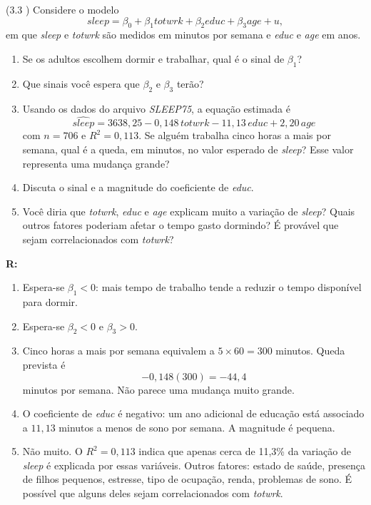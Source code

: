 \documentclass[12pt,letterpaper, onecolumn]{exam}
\renewenvironment{solution}
  {\par\noindent\textbf{R:}\enspace\color{blue}}
  {\par\color{black}}
\begin{document}
\begin{questions}
\question (3.3 \citep{wooldridge2016}) Considere o modelo
\[
sleep=\beta_0+\beta_1totwrk+\beta_2educ+\beta_3age+u,
\]
em que \textit{sleep} e \textit{totwrk} são medidos em minutos por semana e \textit{educ} e \textit{age} em anos.
\begin{enumerate}[label=(\alph*)]
    \item Se os adultos escolhem dormir e trabalhar, qual é o sinal de $\beta_1$?
    \item Que sinais você espera que $\beta_2$ e $\beta_3$ terão?
    \item Usando os dados do arquivo \textit{SLEEP75}, a equação estimada é
    \[
    \widehat{sleep}=3638{,}25-0{,}148\,totwrk-11{,}13\,educ+2{,}20\,age
    \]
    com \(n=706\) e \(R^2=0{,}113\). Se alguém trabalha cinco horas a mais por semana, qual é a queda, em minutos, no valor esperado de \textit{sleep}? Esse valor representa uma mudança grande?
    \item Discuta o sinal e a magnitude do coeficiente de \textit{educ}.
    \item Você diria que \textit{totwrk}, \textit{educ} e \textit{age} explicam muito a variação de \textit{sleep}? Quais outros fatores poderiam afetar o tempo gasto dormindo? É provável que sejam correlacionados com \textit{totwrk}?
\end{enumerate}

\begin{solution}
\begin{enumerate}[label=(\alph*)]
    \item Espera-se \(\beta_1<0\): mais tempo de trabalho tende a reduzir o tempo disponível para dormir.
    \item Espera-se \(\beta_2<0\) e \(\beta_3>0\).
    \item Cinco horas a mais por semana equivalem a \(5\times 60=300\) minutos. Queda prevista é
    \[
    -0{,}148(300)=-44{,}4
    \]
    minutos por semana. Não parece uma mudança muito grande.
    \item O coeficiente de \textit{educ} é negativo: um ano adicional de educação está associado a \(11{,}13\) minutos a menos de sono por semana. A magnitude é pequena.
    \item Não muito. O \(R^2=0{,}113\) indica que apenas cerca de 11,3\% da variação de \textit{sleep} é explicada por essas variáveis. Outros fatores: estado de saúde, presença de filhos pequenos, estresse, tipo de ocupação, renda, problemas de sono. É possível que alguns deles sejam correlacionados com \textit{totwrk}.
\end{enumerate}
\end{solution}


\end{questions}
\end{document}
